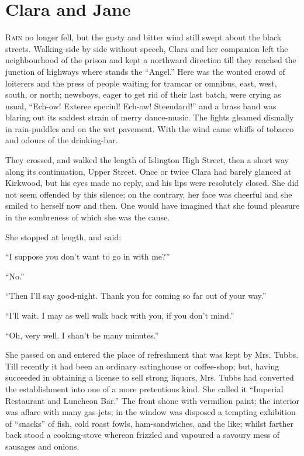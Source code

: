 \chapter{Clara and Jane}

\textsc{Rain} no longer fell, but the gusty and bitter wind still swept
about the black streets. Walking side by side without speech, Clara and
her companion left the neighbourhood of the prison and kept a northward
direction till they reached the junction of highways where stands the
``Angel.'' Here was the wonted crowd of loiterers and the press of
people waiting for tramcar or omnibus, east, west, south, or north;
newsboys, eager to get rid of their last batch, were crying as usual,
``Ech-ow! Exteree speciul! Ech-ow! Steendard!'' and a brass band was
blaring out its saddest strain of merry dance-music. The lights gleamed
dismally in rain-puddles and on the wet pavement. With the wind {}came
whiffs of tobacco and odours of the drinking-bar.

They crossed, and walked the length of Islington High Street, then a
short way along its continuation, Upper Street. Once or twice Clara had
barely glanced at Kirkwood, but his eyes made no reply, and his lips
were resolutely closed. She did not seem offended by this silence; on
the contrary, her face was cheerful and she smiled to herself now and
then. One would have imagined that she found pleasure in the sombreness
of which she was the cause.

She stopped at length, and said:

``I suppose you don't want to go in with me?''

``No.''

``Then I'll say good-night. Thank you for coming so far out of your
way.''

``I'll wait. I may as well walk back with you, if you don't mind.''

``Oh, very well. I shan't be many minutes.''

She passed on and entered the place of {}refreshment that was kept by
Mrs. Tubbs. Till recently it had been an ordinary eatinghouse or
coffee-shop; but, having succeeded in obtaining a license to sell strong
liquors, Mrs. Tubbs had converted the establishment into one of a more
pretentious kind. She called it ``Imperial Restaurant and Luncheon
Bar.'' The front shone with vermilion paint; the interior was aflare
with many gas-jets; in the window was disposed a tempting exhibition of
``snacks'' of fish, cold roast fowls, ham-sandwiches, and the like;
whilst farther back stood a cooking-stove whereon frizzled and vapoured
a savoury mess of sausages and onions.

